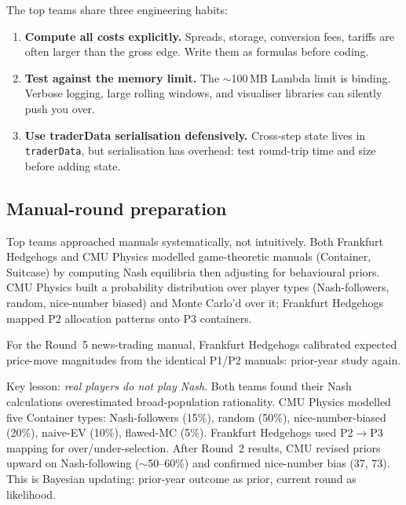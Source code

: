 \begin{keyfactbox}
The top teams share three engineering habits:
\begin{enumerate}
  \item \textbf{Compute all costs explicitly.}  Spreads, storage,
        conversion fees, tariffs are often larger than the gross
        edge.  Write them as formulas before coding.
  \item \textbf{Test against the memory limit.}  The $\sim$100\,MB
        Lambda limit is binding.  Verbose logging, large rolling
        windows, and visualiser libraries can silently push you
        over.
  \item \textbf{Use traderData serialisation defensively.}
        Cross-step state lives in \texttt{traderData}, but
        serialisation has overhead: test round-trip time and size
        before adding state.
\end{enumerate}
\end{keyfactbox}

\subsection{Manual-round preparation}
\label{sec:manual_prep}

Top teams approached manuals systematically, not intuitively.
Both Frankfurt Hedgehogs and CMU Physics modelled game-theoretic
manuals (Container, Suitcase) by computing Nash equilibria then
adjusting for behavioural priors.  CMU Physics built a probability
distribution over player types (Nash-followers, random, nice-number
biased) and Monte Carlo'd over it; Frankfurt Hedgehogs mapped P2
allocation patterns onto P3 containers.

For the Round~5 news-trading manual, Frankfurt Hedgehogs calibrated
expected price-move magnitudes from the identical P1/P2 manuals:
prior-year study again.

Key lesson: \emph{real players do not play Nash}.  Both teams
found their Nash calculations overestimated broad-population
rationality.  CMU Physics modelled five Container types:
Nash-followers (15\%), random (50\%), nice-number-biased (20\%),
naive-EV (10\%), flawed-MC (5\%).  Frankfurt Hedgehogs used P2$\to$P3
mapping for over/under-selection.  After Round~2 results, CMU
revised priors upward on Nash-following ($\sim$50--60\%) and
confirmed nice-number bias (37, 73).  This is Bayesian updating:
prior-year outcome as prior, current round as likelihood.

